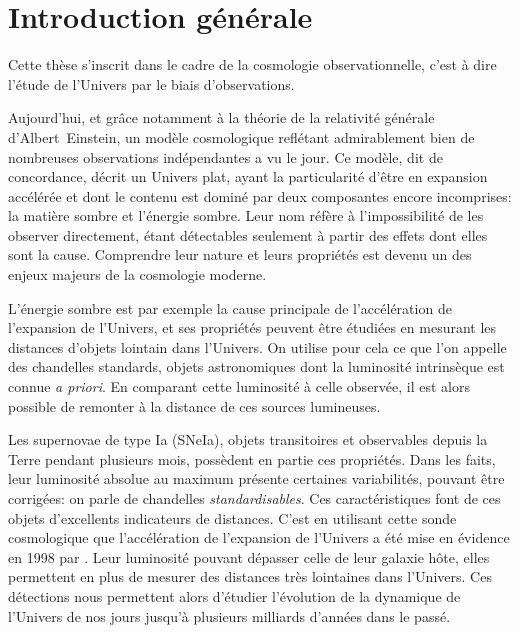 \documentclass[../main/main.tex]{subfiles}
\begin{document}
\chapter*{Introduction générale}\label{cp:intro}
\vspace{1cm}

Cette thèse s'inscrit dans le cadre de la cosmologie observationnelle,
c'est à dire l'étude de l'Univers par le biais d'observations.

Aujourd'hui, et grâce notamment à la théorie de la relativité générale
\mbox{d'Albert Einstein}, un modèle cosmologique reflétant admirablement bien
de nombreuses observations indépendantes a vu le jour. Ce modèle, dit de
concordance, décrit un Univers plat, ayant la particularité d'être
en expansion accélérée et dont le contenu est dominé par deux
composantes encore incomprises: la matière sombre et l'énergie sombre.
Leur nom réfère à l'impossibilité de les observer
directement, étant détectables seulement à partir des effets dont elles sont la
cause.
Comprendre leur nature et leurs propriétés est devenu un des enjeux majeurs de la cosmologie
moderne.

L'énergie sombre est par exemple la cause principale de l'accélération
de l'expansion de l'Univers, et ses propriétés peuvent être étudiées en mesurant les
distances d'objets lointain dans l'Univers. On utilise pour cela ce que
l'on appelle des chandelles standards, objets astronomiques dont la
luminosité intrinsèque est connue \textit{a priori}. En comparant cette
luminosité à celle observée, il est alors possible de remonter à la
distance de ces sources lumineuses.

Les supernovae de type Ia (SNeIa), objets transitoires et observables
depuis la Terre pendant plusieurs mois,
possèdent en partie ces propriétés. Dans les faits, leur luminosité
absolue au maximum présente certaines variabilités, pouvant être
corrigées: on parle de chandelles \textit{standardisables}. Ces
caractéristiques font de ces objets d'excellents indicateurs de distances. C'est en utilisant cette sonde
cosmologique que l'accélération de l'expansion de l'Univers a été mise en évidence en 1998 par
\citet{Riess1998,Perlmutter1999}. Leur luminosité
pouvant dépasser celle de leur galaxie hôte, elles permettent en plus de mesurer
des distances très lointaines dans l'Univers. Ces détections nous
permettent alors
d'étudier l'évolution de la dynamique de l'Univers de nos jours jusqu'à
plusieurs milliards d'années dans le passé.
\end{document}
